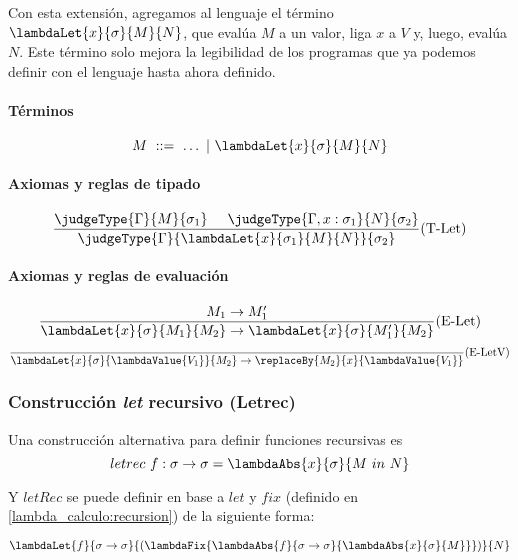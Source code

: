 Con esta extensión, agregamos al lenguaje el término \(\lambdaLet{x}{\sigma}{M}{N}\), que evalúa \(M\) a un valor, liga \(x\) a \(V\) y, luego, evalúa \(N\). Este término solo mejora la legibilidad de los programas que ya podemos definir con el lenguaje hasta ahora definido.

\paragraph{Términos}
\[ M~::=~ \dots~|~\lambdaLet{x}{\sigma}{M}{N} \]


\paragraph{Axiomas y reglas de tipado}
\begin{equation*}
	\frac{\judgeType{\Gamma}{M}{\sigma_1}\hspace*{5mm}\judgeType{\Gamma,x:\sigma_1}{N}{\sigma_2}}{\judgeType{\Gamma}{\lambdaLet{x}{\sigma_1}{M}{N}}{\sigma_2}}(\text{T-Let})
\end{equation*}

\paragraph{Axiomas y reglas de evaluación}

\begin{equation*}
	\frac{M_1\to M_1'}{\lambdaLet{x}{\sigma}{M_1}{M_2}\to \lambdaLet{x}{\sigma}{M'_1}{M_2}}(\text{E-Let})
\end{equation*}
\vspace*{5mm}
\begin{equation*}
	\frac{}{\lambdaLet{x}{\sigma}{\lambdaValue{V_1}}{M_2}\to \replaceBy{M_2}{x}{\lambdaValue{V_1}}}(\text{E-LetV})
\end{equation*}

\subsubsection{Construcción \texorpdfstring{\textit{let}}{let} recursivo (Letrec)}
Una construcción alternativa para definir funciones recursivas es 
\[letrec~f:\sigma\to\sigma = \lambdaAbs{x}{\sigma}{M~in~N}\]

Y \(letRec\) se puede definir  en base a \(let\) y \(fix\) (definido en \ref{lambda_calculo:recursion}) de la siguiente forma:

\[\lambdaLet{f}{\sigma\to\sigma}{(\lambdaFix{\lambdaAbs{f}{\sigma\to\sigma}{\lambdaAbs{x}{\sigma}{M}}})}{N}\]

